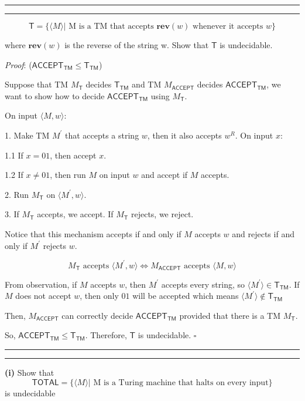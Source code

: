 \documentclass[a4paper, 11pt]{article}
\newcommand{\question}[2] {\vspace{.25in} \hrule\vspace{0.5em}
	\noindent{\bf #1: #2} \vspace{0.5em}
	\hrule \vspace{.10in}}
\renewcommand{\part}[1] {\vspace{.10in} {\bf (#1)}}
\begin{document}
	\question{3}{This is NP}
	
	$$ \textsf{T} = \{\langle M \rangle | \text{ M is a TM that accepts } \textbf{rev}(w) \text{ whenever it accepts } w\} $$
	
	where $\textbf{rev}(w)$ is the reverse of the string w. Show that $\textsf{T}$ is undecidable.
	
	{\em Proof}: ($\textsf{ACCEPT}_{\textsf{TM}} \leq \textsf{T}_{\textsf{TM}} $)
	
	Suppose that TM $M_{\textsf{T}}$ decides $\textsf{T}_{\textsf{TM}}$ and TM $M_{\textsf{ACCEPT}}$ decides $\textsf{ACCEPT}_{\textsf{TM}}$, we want to show how to decide $\textsf{ACCEPT}_{\textsf{TM}}$ using $M_{\textsf{T}}$.
	
	On input $\langle M,w \rangle$:
	
	1. Make TM $M^\prime$ that accepts a string $w$, then it also accepts $w^R$. On input $x$:
	
	1.1 If $x = 01$, then accept $x$.
	
	1.2 If $x \neq 01$, then run $M$ on input $w$ and accept if $M$ accepts.
	
	2. Run $M_{\textsf{T}}$ on $\langle M^\prime,w \rangle$.
	
	3. If $M_{\textsf{T}}$ accepts, we accept. If $M_{\textsf{T}}$ rejects, we reject.
	
	Notice that this mechanism accepts if and only if $M$ accepts $w$ and rejects if and only if $M^\prime$ rejects $w$.
	
	$$ M_{\textsf{T}} \text{ accepts }\langle M^\prime,w \rangle \iff M_{\textsf{ACCEPT}} \text{ accepts } \langle M,w\rangle $$
	
	From observation, if $M$ accepts $w$, then $M^\prime$ accepts every string, so $\langle M^\prime \rangle \in \textsf{T}_{\textsf{TM}}$. If $M$ does not accept $w$, then only $01$ will be accepted which means $\langle M^\prime \rangle \notin \textsf{T}_{\textsf{TM}}$
	
	Then, $M_{\textsf{ACCEPT}}$ can correctly decide $\textsf{ACCEPT}_{\textsf{TM}}$ provided that there is a TM $M_{\textsf{T}}$. 
	
	So, $\textsf{ACCEPT}_{\textsf{TM}} \leq \textsf{T}_{\textsf{TM}} $. Therefore, $\textsf{T}$ is undecidable. $\square$
		
	\question{4}{NP-Complete}
	
	\part{i} Show that 
	$$ \textsf{TOTAL} = \{\langle M \rangle | \text{ M is a Turing machine that halts on every input} \} $$ is undecidable
\end{document}
